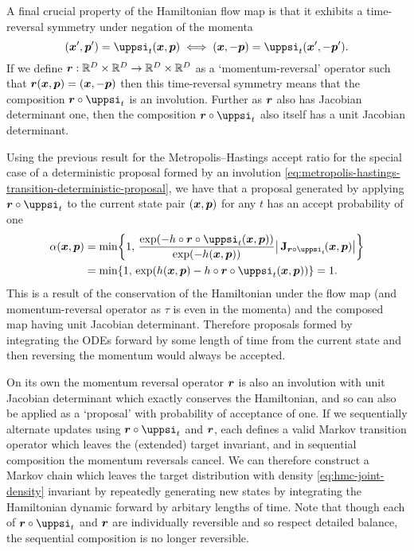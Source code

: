 A final crucial property of the Hamiltonian flow map is that it exhibits a time-reversal symmetry under negation of the momenta
\begin{equation}\label{eq:hamiltonian-dynamic-time-reversal-symmetry}
(\vct{x}',\vct{p}') = \flowmap_t(\vct{x},\vct{p})
\iff
(\vct{x},-\vct{p}) = \flowmap_t(\vct{x}',-\vct{p}').
\end{equation}
If we define $\boldsymbol{r} : \mathbb{R}^D\times\mathbb{R}^D \to \mathbb{R}^D \times \mathbb{R}^D$ as a `momentum-reversal' operator such that $\boldsymbol{r}(\boldsymbol{x},\boldsymbol{p}) = (\boldsymbol{x},-\boldsymbol{p})$ then this time-reversal symmetry means that the composition $\vct{r} \circ \flowmap_t$ is an involution. Further as $\boldsymbol{r}$ also has Jacobian determinant one, then the composition $\vct{r} \circ \flowmap_t$ also itself has a unit Jacobian determinant.

Using the previous result for the Metropolis--Hastings accept ratio for the special case of a deterministic proposal formed by an involution \eqref{eq:metropolis-hastings-transition-deterministic-proposal}, we have that a proposal generated by applying $\vct{r} \circ \flowmap_t$ to the current state pair $(\boldsymbol{x},\boldsymbol{p})$ for any $t$ has an accept probability of one
\begin{align}\label{eq:exact-hmc-accept-probability}
  \alpha(\vct{x},\vct{p}) &=
  \min\lbr 
    1,\,
    \frac
    {
    \exp\lpa
      -\hamiltonian \circ \vct{r} \circ \flowmap_t(\vct{x}, \vct{p})
    \rpa
    }
    {
    \exp\lpa
      -\hamiltonian(\vct{x},\vct{p})
    \rpa
    }
    \left|\,\jacob{\vct{r} \circ \flowmap_t}{\vct{x},\vct{p}}\right|
  \rbr\\
  &=
  \min\lbr 
    1,\,
    \exp\lpa
      \hamiltonian(\vct{x},\vct{p}) -\hamiltonian \circ \vct{r} \circ \flowmap_t(\vct{x}, \vct{p})
    \rpa
  \rbr = 1.
\end{align}
This is a result of the conservation of the Hamiltonian under the flow map (and momentum-reversal operator as $\tau$ is even in the momenta) and the composed map having unit Jacobian determinant. Therefore proposals formed by integrating the \acp{ODE} forward by some length of time from the current state and then reversing the momentum would always be accepted. 

On its own the momentum reversal operator $\boldsymbol{r}$ is also an involution with unit Jacobian determinant which exactly conserves the Hamiltonian, and so can also be applied as a `proposal'  with probability of acceptance of one. If we sequentially alternate updates using $\vct{r} \circ \flowmap_t$ and $\boldsymbol{r}$, each defines a valid Markov transition operator which leaves the (extended) target invariant, and in sequential composition the momentum reversals cancel. We can therefore construct a Markov chain which leaves the target distribution with density \eqref{eq:hmc-joint-density} invariant by repeatedly generating new states by integrating the Hamiltonian dynamic forward by arbitary lengths of time. Note that though each of $\vct{r} \circ \flowmap_t$ and $\boldsymbol{r}$ are individually reversible and so respect detailed balance, the sequential composition is no longer reversible.

